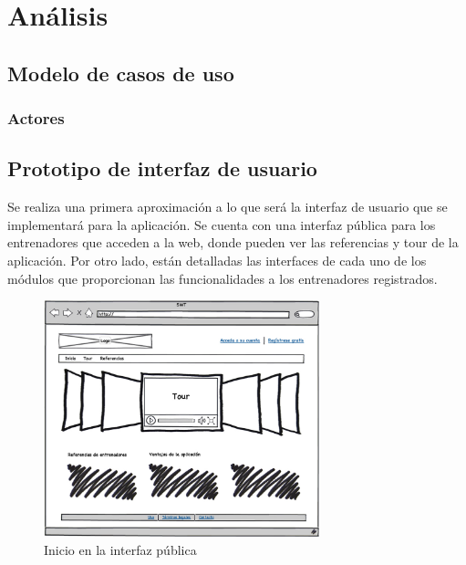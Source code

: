 %

\chapter{Análisis} %
	\label{cha:analisis}

% 
%
\section{Modelo de casos de uso} %
	\label{sec:modelo_casos_de_uso}
	
	\subsection{Actores} %
		\label{sub:actores}
	

%
%
\section{Prototipo de interfaz de usuario} %
	\label{sec:prototipo_de_interfaz_de_usuario}

	Se realiza una primera aproximación a lo que será la interfaz de usuario que se implementará para la aplicación. Se cuenta con una interfaz pública para los entrenadores que acceden a la web, donde pueden ver las referencias y tour de la aplicación. Por otro lado, están detalladas las interfaces de cada uno de los módulos que proporcionan las funcionalidades a los entrenadores registrados.
	
	\begin{figure}[H]
	  \centering
	    \includegraphics[width=8cm]{./eps/p_interfaz/1_Inicio.eps}
	  \caption{Inicio en la interfaz pública}
	  \label{fig:interfaz_publica_inicio}
	\end{figure}
	
